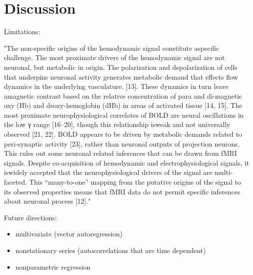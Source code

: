 \documentclass[latex/main.tex]{subfiles}
\begin{document}
\section{Discussion}

Limitations:

"The non-specific origins of the hemodynamic signal constitute aspecific challenge. The most proximate drivers of the hemodynamic signal are not neuronal, but metabolic in origin. The polarization and depolarization of cells that underpins neuronal activity generates metabolic demand that effects flow dynamics in the underlying vasculature. [13]. These dynamics in turn leave amagnetic contrast based on the relative concentration of para and di-magnetic oxy (Hb) and deoxy-hemoglobin (dHb) in areas of activated tissue [14, 15]. The most proximate neurophysiological correlates of BOLD are neural oscillations in the low γ range [16–20], though this relationship isweak and not universally observed [21, 22]. BOLD appears to be driven by metabolic demands related to peri-synaptic activity [23], rather than neuronal outputs of projection neurons. This rules out some neuronal related inferences that can be drawn from fMRI signals. Despite co-acquisition of hemodynamic and electrophysiological signals, it iswidely accepted that the neurophysiological drivers of the signal are multi-faceted. This “many-to-one” mapping from the putative origins of the signal to its observed properties means that fMRI data do not permit specific inferences about neuronal process [12]."

Future directions:

\begin{itemize}
    \item multivariate (vector autoregression)
    \item nonstationary series (autocorrelations that are time dependent)
    \item nonparametric regression
\end{itemize}
\end{document}
